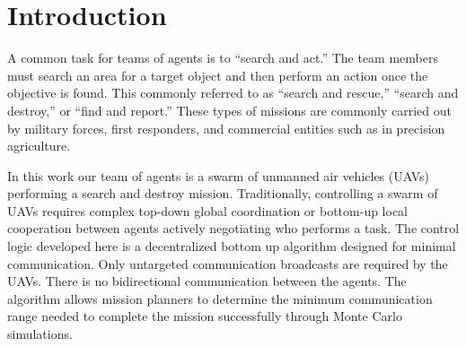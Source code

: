 \chapter{Introduction}
A common task for teams of agents is to ``search and act.''  The team members must search an area for a target object and then perform an action once the objective is found.  This commonly referred to as ``search and rescue,'' ``search and destroy,'' or ``find and report.''  These types of missions are commonly carried out by military forces, first responders, and commercial entities such as in precision agriculture.

In this work our team of agents is a swarm of unmanned air vehicles (UAVs) performing a search and destroy mission.  Traditionally, controlling a swarm of UAVs requires complex top-down global coordination or bottom-up local cooperation between agents actively negotiating who performs a task.  The control logic developed here is a decentralized bottom up algorithm designed for minimal communication.  Only untargeted communication broadcasts are required by the UAVs.  There is no bidirectional communication between the agents.  The algorithm allows mission planners to determine the minimum communication range needed to complete the mission successfully through Monte Carlo simulations.  

